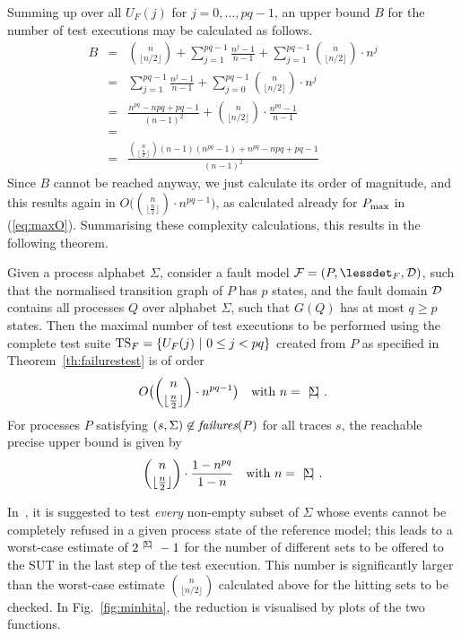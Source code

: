 %
Summing up over all $U_F(j)$ for $j=0,\dots,pq-1$,  an upper bound $B$ for the number of test executions may be calculated as follows.
%
\begin{eqnarray*}
B & = & \binom{n}{\lfloor n/2\rfloor} + \sum_{j=1}^{pq-1} \frac{n^j - 1}{n-1} +
\sum_{j=1}^{pq-1}\binom{n}{\lfloor n/2\rfloor}\cdot n^j
   \\
& = &    \sum_{j=1}^{pq-1} \frac{n^j - 1}{n-1} +
\sum_{j=0}^{pq-1}\binom{n}{\lfloor n/2\rfloor}\cdot n^j
\\
& = & \frac{n^{pq}-n pq+pq-1}{(n-1)^2} +
\binom{n}{\lfloor n/2\rfloor} \cdot \frac{n^{pq} - 1}{n-1}
\\
& = &
\\
& = & \frac{\binom{n}{\left\lfloor \frac{n}{2}\right\rfloor}(n-1) \left(n^{pq}-1\right) +n^{pq}-npq+pq-1}{(n-1)^2}
\end{eqnarray*}
%
Since  $B$ cannot be reached anyway,
we just calculate its order of magnitude, and this results again in $O\big(\binom{n}{\lfloor\frac{n}{2}\rfloor}  \cdot n^{pq-1}\big)$, as calculated already for $P_\text{max}$ in (\ref{eq:maxO}).
%
Summarising these complexity calculations, this results in the following theorem.
%
\begin{theorem}
\label{th:maxexecs}
Given a process alphabet $\Sigma$, consider a fault model ${\cal F} = (P,\lessdet_F,{\cal D})$, such that
the normalised transition graph of $P$ has $p$ states, and the fault domain
${\cal D}$ contains all processes $Q$ over alphabet $\Sigma$, such that $G(Q)$ has at most
$q\ge p$ states. Then the maximal
number of test executions to be performed   using the complete test
suite ${\text{TS}}_F = \{ U_F(j)~|~0 \le j < pq  \}$ created from $P$ as specified in Theorem~\ref{th:failurestest} is of order
%
\begin{equation*}
O\big(\binom{n}{\lfloor\frac{n}{2}\rfloor}\cdot n^{pq-1}\big)\quad\text{with $n={~|\! \Sigma\!|~}$}.
\end{equation*}
For processes $P$ satisfying $(s,\Sigma)\not\in\text{\it failures}(P)$ for all traces $s$, the reachable
precise  upper bound is given by
%
\begin{equation*}
\binom{n}{\lfloor\frac{n}{2}\rfloor}\cdot\frac{1-n^{pq}}{1-n}\quad\text{with $n={~|\! \Sigma\!|~}$}.
\end{equation*}
\xbox
\end{theorem}
%


%
In~\cite{Hennessy:1988:ATP:50497}, it is suggested to test {\it every}
non-empty subset of $\Sigma$ whose events cannot be completely refused in a
given process state of the reference model; this leads to a worst-case
estimate of $2^{{~|\! \Sigma\!|~}}-1$ for the number of different sets to be
offered to the SUT in the last step of the test execution. This number is significantly larger than the worst-case estimate $\binom{n}{\lfloor n/2\rfloor}$ calculated above for the
hitting sets to be checked.
In Fig.~\ref{fig:minhita}, the reduction is visualised by plots of
the two functions.




